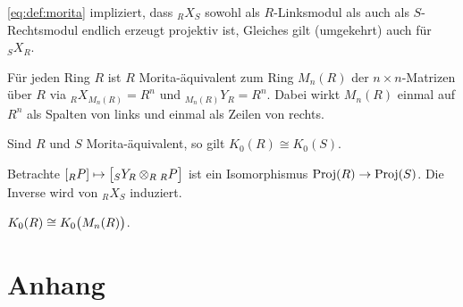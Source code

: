 \begin{bemerkung}
	\eqref{eq:def:morita} impliziert, dass $_R X_S$ sowohl als $R$-Linksmodul als auch als $S$-Rechtsmodul endlich erzeugt projektiv ist,
	Gleiches gilt (umgekehrt) auch für ${_S X_R}$.
\end{bemerkung}

\begin{beispiel}
	Für jeden Ring $R$ ist $R$ Morita-äquivalent zum Ring $M_n(R)$ der $n \times n$-Matrizen über $R$ via ${_R X_{M_n(R)}}=R^n$ und $_{M_n(R)} Y_R = R^n$.
	Dabei wirkt $M_n(R)$ einmal auf $R^n$ als Spalten von links und einmal als Zeilen von rechts.
\end{beispiel}

\begin{satz}[{name=[K0 ist Morita-invariant]}]
	Sind $R$ und $S$ Morita-äquivalent, so gilt $K_0(R) \cong K_0(S)$.
\end{satz}
\begin{beweis}
	Betrachte $\benbrace*{_R P} \mapsto \benbrace[\big]{{_S Y_R} \otimes_R {_R P}}$ ist ein Isomorphismus $\Proj(R) \to \Proj(S)$.
	Die Inverse wird von $_R X _S$ induziert.
\end{beweis}

\begin{korollarB}
	$K_0(R) \cong K_0 \enbrace[\big]{M_n(R)}$.
\end{korollarB}



\cleardoubleoddemptypage
{}
\setcounter{page}{1}
\cleardoubleoddemptypage
\appendix

\section{Anhang} %
\label{sec:anhang}

\printindex
\printbibliography
\listoffigures
\todototoc
{}


